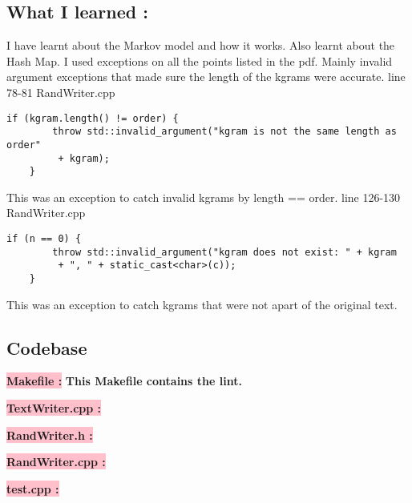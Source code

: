 \subsection{What I learned :}

I have learnt about the Markov model and how it works. Also learnt about the Hash Map. I used exceptions on all the points listed in the pdf. Mainly invalid argument exceptions that made sure the length of the kgrams were accurate. 
line 78-81 RandWriter.cpp
 \begin{lstlisting}
if (kgram.length() != order) {
        throw std::invalid_argument("kgram is not the same length as order"
         + kgram);
    }
 \end{lstlisting}
This was an exception to catch invalid kgrams by length == order. 
line 126-130 RandWriter.cpp
 \begin{lstlisting}
if (n == 0) {
        throw std::invalid_argument("kgram does not exist: " + kgram
         + ", " + static_cast<char>(c));
    }
 \end{lstlisting}
This was an exception to catch kgrams that were not apart of the original text. 



\subsection{Codebase}\label{sec:ps6:code}

\textbf{\colorbox{pink}{Makefile :}} \newline \textbf{This Makefile contains the lint.}


\textbf{\colorbox{pink}{TextWriter.cpp :}} 

\textbf{\colorbox{pink}{RandWriter.h :}} 

\newpage

\textbf{\colorbox{pink}{RandWriter.cpp :}} 


\textbf{\colorbox{pink}{test.cpp :}} 




\newpage
